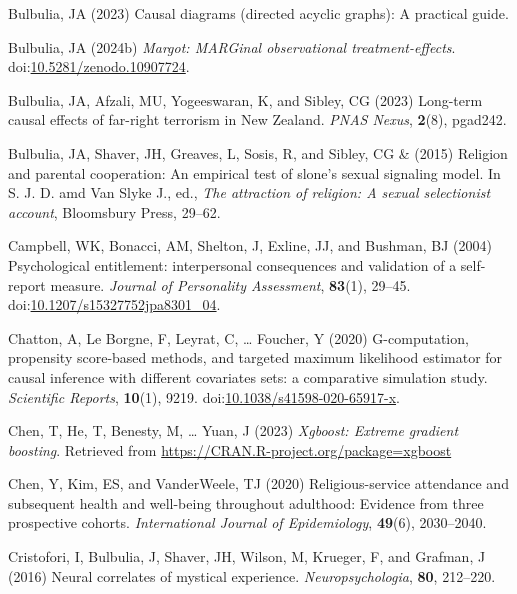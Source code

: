 \documentclass[
  single column]{article}
\newlength{\cslhangindent}
\newenvironment{CSLReferences}[2] %
 {\begin{list}{}{%
  \setlength{\itemindent}{0pt}
  \setlength{\leftmargin}{0pt}
  \setlength{\parsep}{0pt}
  \ifodd #1
   \setlength{\leftmargin}{\cslhangindent}
   \setlength{\itemindent}{-1\cslhangindent}
  \fi
  \setlength{\itemsep}{#2\baselineskip}}}
 {\end{list}}
\begin{document}
\begin{CSLReferences}{1}{0}
Bulbulia, JA (2023) Causal diagrams (directed acyclic graphs): A
practical guide.

Bulbulia, JA (2024b) \emph{Margot: MARGinal observational
treatment-effects}.
doi:\href{https://doi.org/10.5281/zenodo.10907724}{10.5281/zenodo.10907724}.

Bulbulia, JA, Afzali, MU, Yogeeswaran, K, and Sibley, CG (2023)
Long-term causal effects of far-right terrorism in {N}ew {Z}ealand.
\emph{PNAS Nexus}, \textbf{2}(8), pgad242.

Bulbulia, JA, Shaver, JH, Greaves, L, Sosis, R, and Sibley, CG \& (2015)
Religion and parental cooperation: An empirical test of slone's sexual
signaling model. In S. J. D. amd Van Slyke J., ed., \emph{The attraction
of religion: A sexual selectionist account}, Bloomsbury Press, 29--62.

Campbell, WK, Bonacci, AM, Shelton, J, Exline, JJ, and Bushman, BJ
(2004) Psychological entitlement: interpersonal consequences and
validation of a self-report measure. \emph{Journal of Personality
Assessment}, \textbf{83}(1), 29--45.
doi:\href{https://doi.org/10.1207/s15327752jpa8301_04}{10.1207/s15327752jpa8301\_04}.

Chatton, A, Le Borgne, F, Leyrat, C, \ldots{} Foucher, Y (2020)
G-computation, propensity score-based methods, and targeted maximum
likelihood estimator for causal inference with different covariates
sets: a comparative simulation study. \emph{Scientific Reports},
\textbf{10}(1), 9219.
doi:\href{https://doi.org/10.1038/s41598-020-65917-x}{10.1038/s41598-020-65917-x}.

Chen, T, He, T, Benesty, M, \ldots{} Yuan, J (2023) \emph{Xgboost:
Extreme gradient boosting}. Retrieved from
\url{https://CRAN.R-project.org/package=xgboost}

Chen, Y, Kim, ES, and VanderWeele, TJ (2020) Religious-service
attendance and subsequent health and well-being throughout adulthood:
Evidence from three prospective cohorts. \emph{International Journal of
Epidemiology}, \textbf{49}(6), 2030--2040.

Cristofori, I, Bulbulia, J, Shaver, JH, Wilson, M, Krueger, F, and
Grafman, J (2016) Neural correlates of mystical experience.
\emph{Neuropsychologia}, \textbf{80}, 212--220.


\end{CSLReferences}
\end{document}
